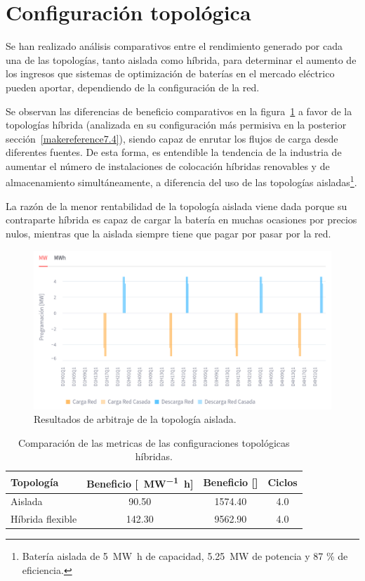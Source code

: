 \section{Configuración topológica}
\label{makereference7.3}

Se han realizado análisis comparativos entre el rendimiento generado por cada una de las topologías, tanto aislada como híbrida, para determinar el aumento de los ingresos que sistemas de optimización de baterías en el mercado eléctrico pueden aportar, dependiendo de la configuración de la red.

Se observan las diferencias de beneficio comparativos en la figura~\ref{fig:posicion-aislada} a favor de la topologías híbrida (analizada en su configuración más permisiva en la posterior sección~\ref{makereference7.4}), siendo capaz de enrutar los flujos de carga desde diferentes fuentes. De esta forma, es entendible la tendencia de la industria de aumentar el número de instalaciones de colocación híbridas renovables y de almacenamiento simultáneamente, a diferencia del uso de las topologías aisladas\footnote{Batería aislada de \SI{5}{{\mega\watt\hour}} de capacidad, \SI{5.25}{{\mega\watt}} de potencia y 87 \% de eficiencia.}.

La razón de la menor rentabilidad de la topología aislada viene dada porque su contraparte híbrida es capaz de cargar la batería en muchas ocasiones por precios nulos, mientras que la aislada siempre tiene que pagar por pasar por la red.

\begin{figure}
  \centering
  \includegraphics[width=0.5\linewidth]{figures/posicion-aislada.png}
  \caption[Resultados de arbitraje de la topología aislada.]{Resultados de arbitraje de la topología aislada.}
  \label{fig:posicion-aislada}
\end{figure}

\begin{table}[ht]
  \centering
  \begin{tabular}{|l|S|S|S|}
    \hline
    Topología        & {Beneficio [\si{\text{\euro}\per\mega\watt\hour}]} & {Beneficio [\si{\text{\euro}}]} & Ciclos \\
    \hline
    Aislada          &  90.50                                             & 1574.40                         & 4.0    \\
    Híbrida flexible & 142.30                                             & 9562.90                         & 4.0    \\
    \hline
  \end{tabular}
  \caption[Comparación de configuraciones topológicas híbridas.]{Comparación de las metricas de las configuraciones topológicas híbridas.}
  \label{tab:comparacion-hibridacion}
\end{table}

